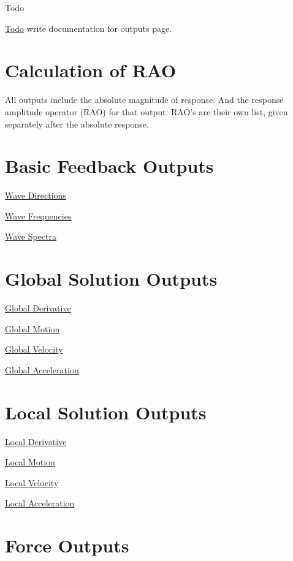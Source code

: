 \begin{DoxyRefDesc}{Todo}
\item[\hyperlink{todo__todo000028}{Todo}]write documentation for outputs page.\end{DoxyRefDesc}


\section*{Calculation of R\-A\-O}

All outputs include the absolute magnitude of response. And the response amplitude operator (R\-A\-O) for that output. R\-A\-O's are their own list, given separately after the absolute response.

\section*{Basic Feedback Outputs}

\hyperlink{wave_directions}{Wave Directions}

\hyperlink{wave_frequencies}{Wave Frequencies}

\hyperlink{output_wave_spectra}{Wave Spectra}

\section*{Global Solution Outputs}

\hyperlink{global_derivative}{Global Derivative}

\hyperlink{global_motion}{Global Motion}

\hyperlink{global_velocity}{Global Velocity}

\hyperlink{global_acceleration}{Global Acceleration}

\section*{Local Solution Outputs}

\hyperlink{local_derivative}{Local Derivative}

\hyperlink{local_motion}{Local Motion}

\hyperlink{local_velocity}{Local Velocity}

\hyperlink{local_acceleration}{Local Acceleration}

\section*{Force Outputs}

